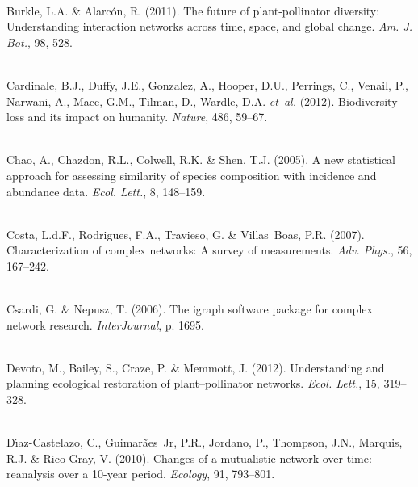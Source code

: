 \documentclass[12pt]{article}
\begin{document}
\begin{thebibliography}{67}
\hspace{0em}\\Burkle, L.A. \& Alarc{\'o}n, R. (2011).
\newblock The future of plant-pollinator diversity: Understanding interaction
  networks across time, space, and global change.
\newblock \emph{Am. J. Bot.}, 98, 528.

\hspace{0em}\\Cardinale, B.J., Duffy, J.E., Gonzalez, A., Hooper, D.U.,
  Perrings, C., Venail, P., Narwani, A., Mace, G.M., Tilman, D., Wardle, D.A.
  \emph{et~al.} (2012).
\newblock Biodiversity loss and its impact on humanity.
\newblock \emph{Nature}, 486, 59--67.

\hspace{0em}\\Chao, A., Chazdon, R.L., Colwell, R.K. \& Shen, T.J. (2005).
\newblock A new statistical approach for assessing similarity of species
  composition with incidence and abundance data.
\newblock \emph{Ecol. Lett.}, 8, 148--159.

\hspace{0em}\\Costa, L.d.F., Rodrigues, F.A., Travieso, G. \& Villas~Boas, P.R.
  (2007).
\newblock Characterization of complex networks: A survey of measurements.
\newblock \emph{Adv. Phys.}, 56, 167--242.

\hspace{0em}\\Csardi, G. \& Nepusz, T. (2006).
\newblock The igraph software package for complex network research.
\newblock \emph{InterJournal}, p. 1695.

\hspace{0em}\\Devoto, M., Bailey, S., Craze, P. \& Memmott, J. (2012).
\newblock Understanding and planning ecological restoration of
  plant--pollinator networks.
\newblock \emph{Ecol. Lett.}, 15, 319--328.

\hspace{0em}\\D{\'\i}az-Castelazo, C., Guimar{\~a}es~Jr, P.R., Jordano, P.,
  Thompson, J.N., Marquis, R.J. \& Rico-Gray, V. (2010).
\newblock Changes of a mutualistic network over time: reanalysis over a 10-year
  period.
\newblock \emph{Ecology}, 91, 793--801.


\end{thebibliography}
\end{document}
